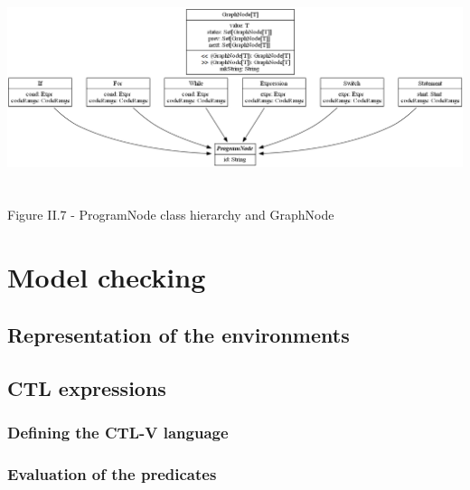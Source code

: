 \documentclass{report}
\begin{document}
\begin{center}
\includegraphics[scale=0.5]{data/CFG_classes.png}
~\\~\\Figure II.7 - ProgramNode class hierarchy and GraphNode
\end{center}

\paragraph{}
\hspace{4mm}\textnormal{}

\chapter{Model checking}

\section{Representation of the environments}

\subsection{}

\section{CTL expressions}

\subsection{Defining the CTL-V language}

\subsection{Evaluation of the predicates}
\end{document}
